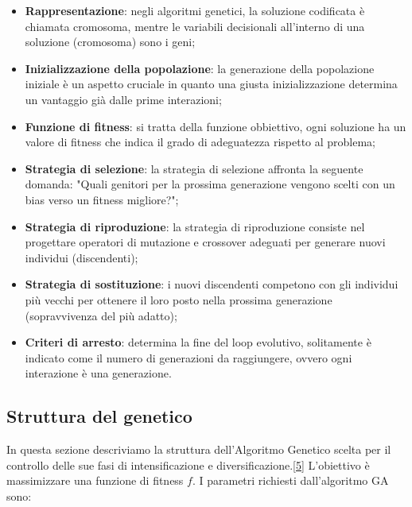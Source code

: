 \begin{itemize}
    \item \textbf{Rappresentazione}: negli algoritmi genetici, la soluzione codificata è chiamata cromosoma, mentre le variabili decisionali all'interno di una soluzione (cromosoma) sono i geni;
    
    \item \textbf{Inizializzazione della popolazione}: la generazione della popolazione iniziale è un aspetto cruciale in quanto una giusta inizializzazione determina un vantaggio già dalle prime interazioni;
    
    \item \textbf{Funzione di fitness}: si tratta della funzione obbiettivo, ogni soluzione ha un valore di fitness che indica il grado di adeguatezza rispetto al problema;
    
    \item \textbf{Strategia di selezione}: la strategia di selezione affronta la seguente domanda: "Quali genitori per la prossima generazione vengono scelti con un bias verso un fitness migliore?";
    
    \item \textbf{Strategia di riproduzione}: la strategia di riproduzione consiste nel progettare operatori di mutazione e crossover adeguati per generare nuovi individui (discendenti);
    
    \item \textbf{Strategia di sostituzione}: i nuovi discendenti competono con gli individui più vecchi per ottenere il loro posto nella prossima generazione (sopravvivenza del più adatto);
    
    \item \textbf{Criteri di arresto}: determina la fine del loop evolutivo, solitamente è indicato come il numero di generazioni da raggiungere, ovvero ogni interazione è una generazione.
\end{itemize}

\subsection{Struttura del genetico} \hypertarget{ga}{}

In questa sezione descriviamo la struttura dell'Algoritmo Genetico scelta per il controllo delle sue fasi di intensificazione e diversificazione.[\hyperlink{bibliografia}{5}]
L'obiettivo è massimizzare una funzione di fitness $f$. I parametri richiesti dall'algoritmo GA sono:

